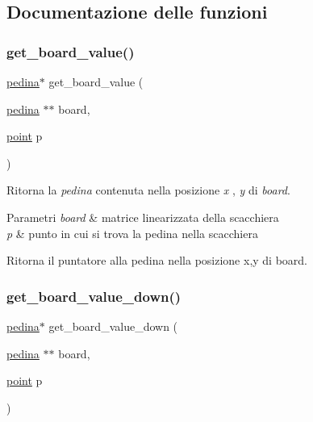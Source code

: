 \subsection{Documentazione delle funzioni}
\mbox{\label{group__Ausiliarie_gacbcceb01143b3098ac3ee65642d94a35}} 
\subsubsection{\texorpdfstring{get\+\_\+board\+\_\+value()}{get\_board\_value()}}
{\footnotesize\ttfamily \hyperlink{ml__lib_8h_a71fee95122b31f5cb0b07d9c16ffa3a5}{pedina}$\ast$ get\+\_\+board\+\_\+value (\begin{DoxyParamCaption}\item[{\hyperlink{ml__lib_8h_a71fee95122b31f5cb0b07d9c16ffa3a5}{pedina} $\ast$$\ast$}]{board,  }\item[{\hyperlink{structpunto}{point}}]{p }\end{DoxyParamCaption})}



Ritorna la {\itshape pedina} contenuta nella posizione {\itshape x} , {\itshape y} di {\itshape board}. 


\begin{DoxyParams}{Parametri}
{\em board} & matrice linearizzata della scacchiera \\
\hline
{\em p} & punto in cui si trova la pedina nella scacchiera\\
\hline
\end{DoxyParams}
Ritorna il puntatore alla pedina nella posizione x,y di board. \mbox{\label{group__Ausiliarie_gacde6d4e847576a401af96d1d84733533}} 
\subsubsection{\texorpdfstring{get\+\_\+board\+\_\+value\+\_\+down()}{get\_board\_value\_down()}}
{\footnotesize\ttfamily \hyperlink{ml__lib_8h_a71fee95122b31f5cb0b07d9c16ffa3a5}{pedina}$\ast$ get\+\_\+board\+\_\+value\+\_\+down (\begin{DoxyParamCaption}\item[{\hyperlink{ml__lib_8h_a71fee95122b31f5cb0b07d9c16ffa3a5}{pedina} $\ast$$\ast$}]{board,  }\item[{\hyperlink{structpunto}{point}}]{p }\end{DoxyParamCaption})}



